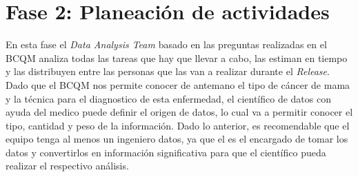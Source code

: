 \section{Fase 2: Planeación de actividades}
En esta fase el \textit{Data Analysis Team} basado en las preguntas realizadas en el BCQM analiza todas las tareas que hay que llevar a cabo, las estiman en tiempo y las distribuyen entre las personas que las van a realizar durante el \textit{Release}. Dado que el BCQM nos permite conocer de antemano el tipo de cáncer de mama y la técnica para el diagnostico de esta enfermedad, el científico de datos con ayuda del medico puede definir el origen de datos, lo cual va a permitir conocer el tipo, cantidad y peso de la información. Dado lo anterior, es recomendable que el equipo tenga al menos un ingeniero datos, ya que el es el encargado de tomar los datos y convertirlos en información significativa para que el científico pueda realizar el respectivo análisis.   